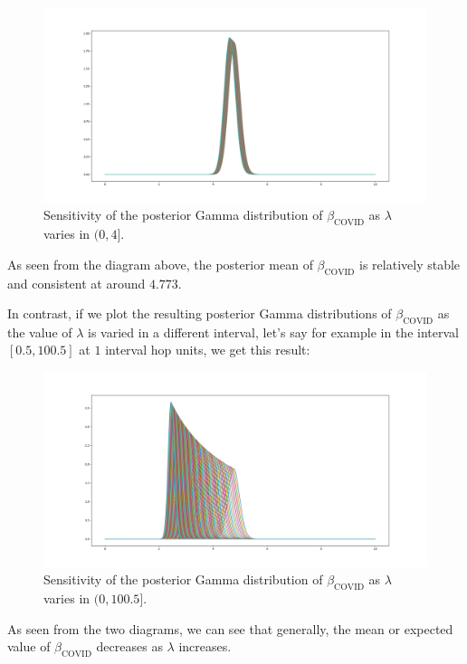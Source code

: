 \documentclass[11pt,fancychapters]{article}
\begin{document}
\begin{figure}[H]\label{fig:normal_sensitivity}
\centering
\includegraphics[width=.9\textwidth]{diagrams/normal_sensitivity.png}
\caption{Sensitivity of the posterior Gamma distribution of $\beta_\text{COVID}$ as $\lambda$ varies in $(0, 4]$.}
\label{fig:normal_sensitivity_graph}
\end{figure}

As seen from the diagram above, the posterior mean of $\beta_\text{COVID}$ is relatively stable and consistent at around $4.773$.\newline

In contrast, if we plot the resulting posterior Gamma distributions of $\beta_\text{COVID}$ as the value of $\lambda$ is varied in a different interval, let's say for example in the interval $[0.5, 100.5]$ at $1$ interval hop units, we get this result:

\begin{figure}[H]\label{fig:large_sensitivity}
\centering
\includegraphics[width=.9\textwidth]{diagrams/large_sensitivity.png}
\caption{Sensitivity of the posterior Gamma distribution of $\beta_\text{COVID}$ as $\lambda$ varies in $(0, 100.5]$.}
\label{fig:large_sensitivity_graph}
\end{figure}

As seen from the two diagrams, we can see that generally, the mean or expected value of $\beta_\text{COVID}$ decreases as $\lambda$ increases.
\end{document}
